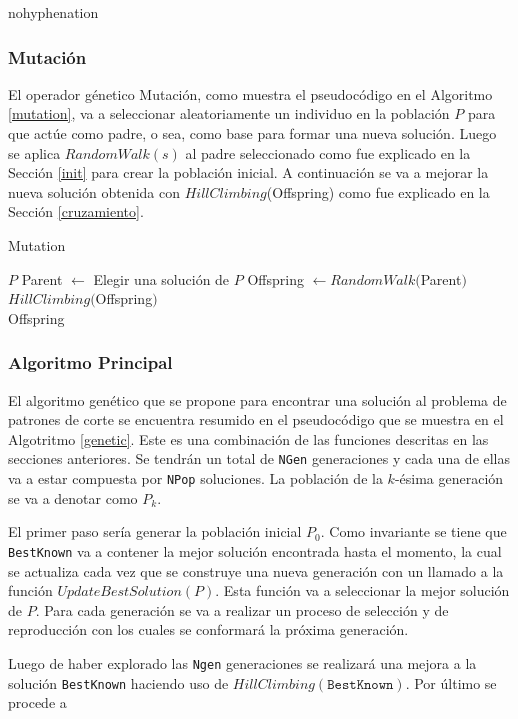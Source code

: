 \documentclass[a4paper,10pt,twocolumn]{article}
\begin{document}
\begin{hyphenrules}{nohyphenation}
\subsubsection{Mutación}

El operador génetico Mutación, como muestra el pseudocódigo en el Algoritmo 	\ref{mutation}, va a seleccionar aleatoriamente un individuo en la población $P$ para que actúe como padre, o sea, como base para formar una nueva solución. Luego se aplica $RandomWalk(s)$ al padre seleccionado como fue explicado en la Sección \ref{init} para crear la población inicial. A continuación se va a mejorar la nueva solución obtenida con $HillClimbing$(Offspring) como fue explicado en la Sección \ref{cruzamiento}.  


\algrenewcommand{}
\begin{algorithm}
	\caption{Mutation}\label{mutation}
	\begin{algorithmic}[1]
		\Require $P$
		\State Parent $\gets $ Elegir una solución de $P$
		\State Offspring $\gets RandomWalk($Parent$)$
		\State $ HillClimbing($Offspring$)$\\
		\Return Offspring 
	\end{algorithmic}
\end{algorithm}


\subsubsection{Algoritmo Principal}
El algoritmo genético que se propone para encontrar una solución al problema de patrones de corte se encuentra resumido en el pseudocódigo que se muestra en el Algotritmo \ref{genetic}. Este es una combinación de las funciones descritas en las secciones anteriores. Se tendrán un total de \texttt{NGen} generaciones y cada una de ellas va a estar compuesta por \texttt{NPop} soluciones. La población de la $k$-ésima generación se va a denotar como $P_k$.

El primer paso sería generar la población inicial $P_0$. Como invariante se tiene que \texttt{BestKnown} va a contener la mejor solución encontrada hasta el momento, la cual se actualiza cada vez que se construye una nueva generación con un llamado a la función $UpdateBestSolution(P)$. Esta función va a seleccionar la mejor solución de $P$. Para cada generación se va a realizar un proceso de selección y de reproducción con los cuales se conformará la próxima generación.

Luego de haber explorado las \texttt{Ngen} generaciones se realizará una mejora a la solución \texttt{BestKnown} haciendo uso de $HillClimbing(\mathtt{BestKnown})$. Por último se procede a 
 

\end{hyphenrules}
\end{document}
